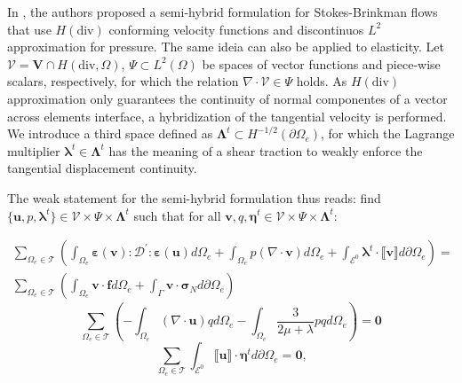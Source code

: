 \documentclass{wccm2024}
\begin{document}
In \cite{carvalho2024semi}, the authors proposed a semi-hybrid formulation for Stokes-Brinkman flows that use $H(\text{div})$ conforming velocity functions and discontinuos $L^2$ approximation for pressure. The same ideia can also be applied to elasticity. Let $\mathcal{V} = \mathbf{V}\cap H(\text{div},\Omega)$, $\Psi \subset L^2(\Omega)$ be spaces of vector functions and piece-wise scalars, respectively, for which the relation $\nabla \cdot \mathcal{V} \in \Psi$ holds. As $H(\text{div})$ approximation only guarantees the continuity of normal componentes of a vector across elements interface, a hybridization of the tangential velocity is performed. We introduce a third space defined as $\boldsymbol{\Lambda}^t \subset H^{-1/2}(\partial\Omega_e)$, for which the Lagrange multiplier $\boldsymbol{\lambda}^t \in \boldsymbol{\Lambda}^t$ has the meaning of a shear traction to weakly enforce the tangential displacement continuity. 

The weak statement for the semi-hybrid formulation thus reads: find $\{\mathbf{u},p,\boldsymbol{\lambda}^t\} \in \mathcal{V} \times \Psi \times \boldsymbol{\Lambda}^t$ such that for all $\mathbf{v},q,\boldsymbol{\eta}^t \in \mathcal{V}\times \Psi \times \boldsymbol{\Lambda}^t$:

\begin{equation} \label{eq:semihybrid1}
    \begin{split}
        \sum_{\Omega_e \in \mathcal{T}} \left( \int_{\Omega_e} \boldsymbol{\varepsilon}(\mathbf{v}) : \mathcal{D}^{'} : \boldsymbol{\varepsilon}(\mathbf{u}) d\Omega_e + \int_{\Omega_e} p (\nabla \cdot \mathbf{v}) d\Omega_e + \int_{\mathcal{E}^0} \boldsymbol{\lambda}^t \cdot \llbracket \mathbf{v} \rrbracket d\partial\Omega_e \right) = \\ \sum_{\Omega_e \in \mathcal{T}} \left( \int_{\Omega_e} \mathbf{v} \cdot \mathbf{f} d\Omega_e + \int_{\Gamma} \mathbf{v} \cdot \boldsymbol{\sigma}_N d\partial\Omega_e \right)
    \end{split}
\end{equation}
\begin{equation} \label{eq:semihybrid2}
    \sum_{\Omega_e \in \mathcal{T}} \left(-\int_{\Omega_e} (\nabla \cdot \mathbf{u}) q d\Omega_e -\int_{\Omega_e} \frac{3}{2\mu+\lambda}p q d\Omega_e \right) = \mathbf{0}
\end{equation}
\begin{equation} \label{eq:semihybrid3}
    \sum_{\Omega_e \in \mathcal{T}} \int_{\mathcal{E}^0} \llbracket \mathbf{u} \rrbracket \cdot \mathbf{\eta}^t d\partial\Omega_e = \mathbf{0} \text{,}
\end{equation}
\end{document}
